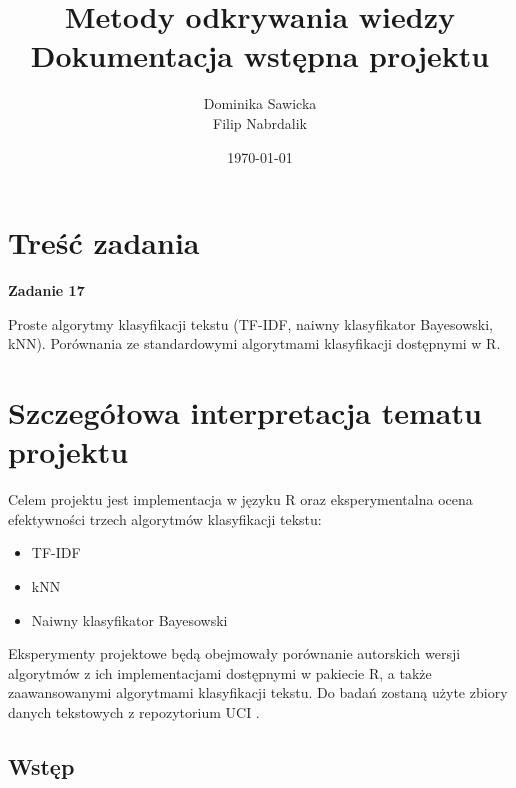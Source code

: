 \documentclass[a4paper, 10pt]{article}
\title{{\bf {Metody odkrywania wiedzy }} \\ {\large Dokumentacja wstępna projektu}}
\date{\today}
\author{Dominika Sawicka \\Filip Nabrdalik}
\begin{document}

\null  %
\nointerlineskip  %
\vfill
\let\snewpage \newpage
\let\newpage \relax
\maketitle %
\let \newpage \snewpage
\vfill
\break %

\tableofcontents

\newpage






\section{Treść zadania}

{\bf{Zadanie 17}}

Proste algorytmy klasyfikacji tekstu (TF-IDF, naiwny klasyfikator Bayesowski, kNN). Porównania ze standardowymi algorytmami klasyfikacji dostępnymi w R.



\section{Szczegółowa interpretacja tematu projektu}

Celem projektu jest implementacja w języku R oraz eksperymentalna ocena efektywności trzech algorytmów klasyfikacji tekstu:
\begin{itemize}
\item TF-IDF 
\item kNN
\item Naiwny klasyfikator Bayesowski
\end{itemize}
Eksperymenty projektowe będą obejmowały porównanie autorskich wersji algorytmów z ich implementacjami dostępnymi w pakiecie R, a także
zaawansowanymi algorytmami klasyfikacji tekstu. Do badań zostaną użyte zbiory danych tekstowych z repozytorium UCI \cite{website:uci}.

\subsection{Wstęp}
\end{document}
